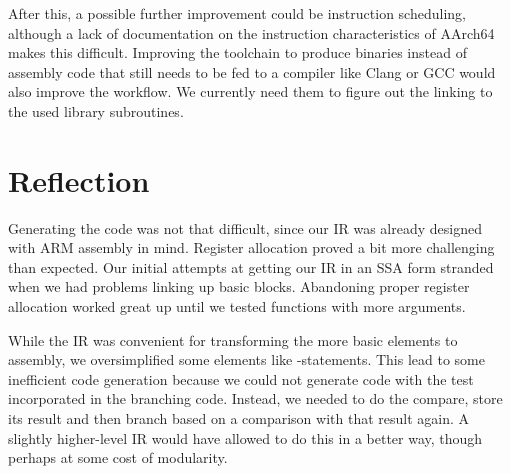After this, a possible further improvement could be instruction scheduling, although a lack of documentation on the instruction characteristics of AArch64 makes this difficult.
Improving the toolchain to produce binaries instead of assembly code that still needs to be fed to a compiler like Clang or GCC would also improve the workflow.
We currently need them to figure out the linking to the used library subroutines.

\section{Reflection}

Generating the code was not that difficult, since our IR was already designed with ARM assembly in mind.
Register allocation proved a bit more challenging than expected.
Our initial attempts at getting our IR in an SSA form stranded when we had problems linking up basic blocks.
Abandoning proper register allocation worked great up until we tested functions with more arguments.

While the IR was convenient for transforming the more basic elements to assembly, we oversimplified some elements like -statements.
This lead to some inefficient code generation because we could not generate code with the test incorporated in the branching code.
Instead, we needed to do the compare, store its result and then branch based on a comparison with that result again.
A slightly higher-level IR would have allowed to do this in a better way, though perhaps at some cost of modularity.
